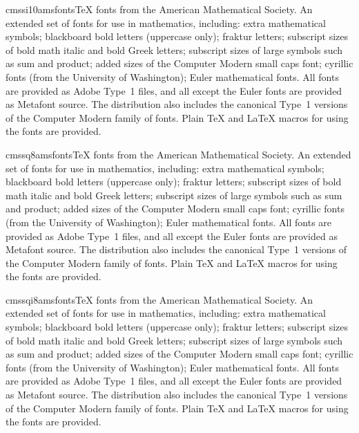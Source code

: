\documentclass{ddltxtyp}
\begin{document}
\begin{package}{cmssi10}{amsfonts}{{\TeX} fonts from the American Mathematical Society.}
An extended set of fonts for use in mathematics, including:
extra mathematical symbols; blackboard bold letters (uppercase
only); fraktur letters; subscript sizes of bold math italic and
bold Greek letters; subscript sizes of large symbols such as
sum and product; added sizes of the Computer Modern small caps
font; cyrillic fonts (from the University of Washington); Euler
mathematical fonts. All fonts are provided as Adobe Type~1
files, and all except the Euler fonts are provided as Metafont
source. The distribution also includes the canonical Type~1
versions of the Computer Modern family of fonts. Plain {\TeX} and
{\LaTeX} macros for using the fonts are provided.
\end{package}
\begin{package}{cmssq8}{amsfonts}{{\TeX} fonts from the American Mathematical Society.}
An extended set of fonts for use in mathematics, including:
extra mathematical symbols; blackboard bold letters (uppercase
only); fraktur letters; subscript sizes of bold math italic and
bold Greek letters; subscript sizes of large symbols such as
sum and product; added sizes of the Computer Modern small caps
font; cyrillic fonts (from the University of Washington); Euler
mathematical fonts. All fonts are provided as Adobe Type~1
files, and all except the Euler fonts are provided as Metafont
source. The distribution also includes the canonical Type~1
versions of the Computer Modern family of fonts. Plain {\TeX} and
{\LaTeX} macros for using the fonts are provided.
\end{package}
\begin{package}{cmssqi8}{amsfonts}{{\TeX} fonts from the American Mathematical Society.}
An extended set of fonts for use in mathematics, including:
extra mathematical symbols; blackboard bold letters (uppercase
only); fraktur letters; subscript sizes of bold math italic and
bold Greek letters; subscript sizes of large symbols such as
sum and product; added sizes of the Computer Modern small caps
font; cyrillic fonts (from the University of Washington); Euler
mathematical fonts. All fonts are provided as Adobe Type~1
files, and all except the Euler fonts are provided as Metafont
source. The distribution also includes the canonical Type~1
versions of the Computer Modern family of fonts. Plain {\TeX} and
{\LaTeX} macros for using the fonts are provided.
\end{package}
\end{document}
